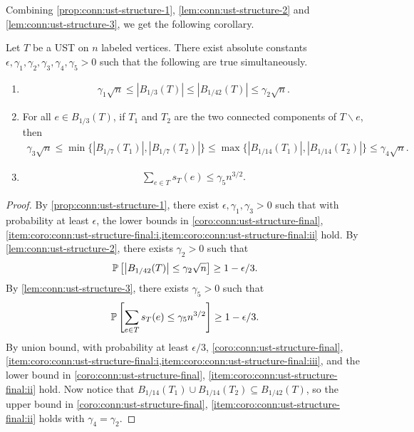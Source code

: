Combining \cref{prop:conn:ust-structure-1}, \cref{lem:conn:ust-structure-2} and \cref{lem:conn:ust-structure-3}, we get the following corollary.
\begin{corollary} \label{coro:conn:ust-structure-final}
  Let $T$ be a UST on $n$ labeled vertices.
  There exist absolute constants $\epsilon,\gamma_1,\gamma_2,\gamma_3,\gamma_4,\gamma_5>0$ such that the following are true simultaneously.
  \begin{enumerate}[label=(\roman*)]
    \item\label{item:coro:conn:ust-structure-final:i}
    \begin{align*}
      \gamma_1\sqrt n \le \left| B_{1/3}(T) \right| \le \left| B_{1/42}(T) \right| \le \gamma_2 \sqrt n.
    \end{align*}
    \item\label{item:coro:conn:ust-structure-final:ii} For all $e\in B_{1/3}(T)$, if $T_1$ and $T_2$ are the two connected components of $T\backslash e$, then
    \begin{align*}
      \gamma_3 \sqrt n \le \min\{\left| B_{1/7}(T_1) \right|,\left| B_{1/7}(T_2) \right|\} \le \max\{\left| B_{1/14}(T_1) \right|,\left| B_{1/14}(T_2) \right|\} \le \gamma_4 \sqrt n.
    \end{align*}
    \item\label{item:coro:conn:ust-structure-final:iii}
    \begin{align*}
      \sum_{e\in T} s_T(e) \le \gamma_5 n^{3/2}.
    \end{align*}
  \end{enumerate}
\end{corollary}
\begin{proof}
  By \cref{prop:conn:ust-structure-1}, there exist $\epsilon,\gamma_1,\gamma_3>0$ such that with probability at least $\epsilon$, the lower bounds in \cref{coro:conn:ust-structure-final}, \cref{item:coro:conn:ust-structure-final:i,item:coro:conn:ust-structure-final:ii} hold.
  By \cref{lem:conn:ust-structure-2}, there exists $\gamma_2>0$ such that
  \begin{align*}
    \mathbb{P}\left[\left| B_{1/42}(T) \right| \le \gamma_2 \sqrt n\right] \ge 1-\epsilon/3.
  \end{align*}
  By \cref{lem:conn:ust-structure-3}, there exists $\gamma_5>0$ such that
  \begin{align*}
    \mathbb{P}\left[\sum_{e\in T} s_T(e) \le \gamma_5 n^{3/2} \right] \ge 1-\epsilon/3.
  \end{align*}
  By union bound, with probability at least $\epsilon/3$, \cref{coro:conn:ust-structure-final}, \cref{item:coro:conn:ust-structure-final:i,item:coro:conn:ust-structure-final:iii}, and the lower bound in \cref{coro:conn:ust-structure-final}, \cref{item:coro:conn:ust-structure-final:ii} hold.
  Now notice that $B_{1/14}(T_1) \cup B_{1/14}(T_2) \subseteq B_{1/42}(T)$, so the upper bound in \cref{coro:conn:ust-structure-final}, \cref{item:coro:conn:ust-structure-final:ii} holds with $\gamma_4=\gamma_2$.
\end{proof}

